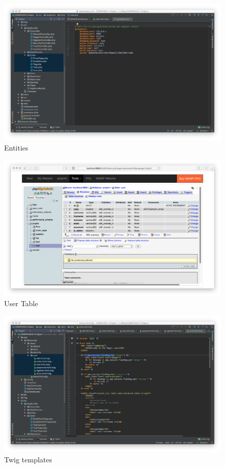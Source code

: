 \begin{figure}[htbp]
   \centering
   \includegraphics[width=400pt]{figures/entities.png} %
   \caption{Entities}
   \label{fig:Entities}
\end{figure}

\begin{figure}[htbp]
   \centering
   \includegraphics[width=400pt]{figures/tables_user_entity.png} %
   \caption{User Table}
   \label{fig:User Table}
\end{figure}

\begin{figure}[htbp]
   \centering
   \includegraphics[width=400pt]{figures/templates.png} %
   \caption{Twig templates}
   \label{fig:Twig templates}
\end{figure}

